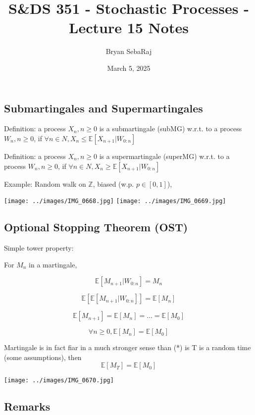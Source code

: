 \documentclass{article}
\title{S\&DS 351 - Stochastic Processes - Lecture 15 Notes}
\author{Bryan SebaRaj}
\date{March 5, 2025}
\begin{document}
\maketitle


\subsection*{Submartingales and Supermartingales}
Definition: a process $X_n, n \geq 0$ is a submartingale (subMG) w.r.t. to a
process $W_n, n\geq0$, if $\forall n \in N, X_n \leq
\mathbb{E}[X_{n+1}|W_{0:n}]$ 

Definition: a process $X_n, n \geq 0$ is a supermartingale (superMG) w.r.t. to
a process $W_n, n\geq0$, if $\forall n \in N, X_n \geq
\mathbb{E}[X_{n+1}|W_{0:n}]$ 

Example: Random walk on $\mathbb{Z}$, biased (w.p. $p\in [0,1]$),

\texttt{[image: ../images/IMG\_0668.jpg]}
\texttt{[image: ../images/IMG\_0669.jpg]}


\subsection*{Optional Stopping Theorem (OST)}
Simple tower property:

For $M_n$ in a martingale, 

$$\mathbb{E}[M_{n+1}|W_{0:n}]=M_n$$

$$\mathbb{E}[\mathbb{E}[M_{n+1}|W_{0:n}]]=\mathbb{E}[M_n]$$

$$\mathbb{E}[M_{n+1}]=\mathbb{E}[M_n] = ... = \mathbb{E}[M_0]$$

$$\forall n \geq 0, \mathbb{E}[M_n]=\mathbb{E}[M_0]$$

Martingale is in fact fiar in a much stronger sense than (*) is T is a random time (some assumptions), then 
$$\mathbb{E}[M_T]=\mathbb{E}[M_0]$$


\texttt{[image: ../images/IMG\_0670.jpg]}

\subsection*{Remarks}
\end{document}
